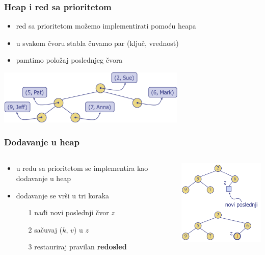 \documentclass[compress,aspectratio=169]{beamer}
\begin{document}
\begin{frame}[fragile]
  \frametitle{Heap i red sa prioritetom}
  \begin{itemize}
    \item red sa prioritetom možemo implementirati pomoću heapa
    \item u svakom čvoru stabla čuvamo par (ključ, vrednost)
    \item pamtimo položaj poslednjeg čvora
  \end{itemize}
  \begin{center}
    \includegraphics[width=9cm]{asp-09-pic05.png}
  \end{center}
\end{frame}

\begin{frame}[fragile]
  \frametitle{Dodavanje u heap}
  \begin{columns}
    \begin{column}[c]{6cm}
      \begin{itemize}
        \item {} u redu sa prioritetom se implementira kao dodavanje
        u heap
        \item dodavanje se vrši u tri koraka
        \begin{itemize}
          \item[1] nađi novi poslednji čvor $z$
          \item[2] sačuvaj ($k$, $v$) u $z$
          \item[3] restauriraj pravilan \textbf{redosled}
        \end{itemize}
      \end{itemize}
    \end{column}
    \begin{column}[c]{5cm}
      \begin{center}
        \includegraphics[width=5cm]{asp-09-pic06.png}
      \end{center}
    \end{column}
  \end{columns}
\end{frame}
\end{document}
